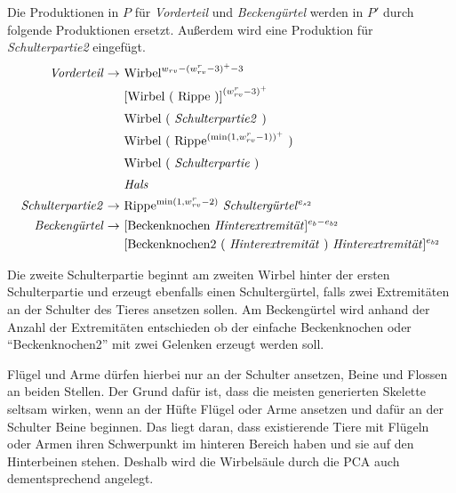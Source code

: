 Die Produktionen in $P$ für \emph{Vorderteil} und \emph{Beckengürtel} werden in $P'$ durch folgende Produktionen ersetzt. Außerdem wird eine Produktion für \emph{Schulterpartie2} eingefügt. 
\begin{align*}
 \text{\emph{Vorderteil}} \rightarrow &\text{ Wirbel}^{w_{rv} - (w_{rv}^r-3)^+ - 3}\\
    &\text{ [Wirbel ( Rippe )]}^{(w_{rv}^r - 3)^+}\\
    &\text{ Wirbel ( \emph{Schulterpartie2} )}^{\vphantom{(}}\\
    &\text{ Wirbel ( Rippe$^{(\text{min}(1, w_{rv}^r-1))^+}$ )}\\
    &\text{ Wirbel ( \emph{Schulterpartie} )}^{\vphantom{(}}\\
    &\text{ \emph{Hals}}^{\vphantom{(}}\\
 \text{\emph{Schulterpartie2}} \rightarrow &\text{ Rippe$^{\text{min}(1,w_{rv}^r-2)}$ \emph{Schultergürtel}$^{e_{s2}}$}\\ 
 \text{\emph{Beckengürtel}} \rightarrow &\text{ [Beckenknochen \emph{Hinterextremität}]$^{e_b - e_{b2}}$}\\
    &\text{ [Beckenknochen2 ( \emph{Hinterextremität} ) \emph{Hinterextremität}]$^{e_{b2}}$}
\end{align*}

Die zweite Schulterpartie beginnt am zweiten Wirbel hinter der ersten Schulterpartie und erzeugt ebenfalls einen Schultergürtel, falls zwei Extremitäten an der Schulter des Tieres ansetzen sollen. Am Beckengürtel wird anhand der Anzahl der Extremitäten entschieden ob der einfache Beckenknochen oder "`Beckenknochen2"' mit zwei Gelenken erzeugt werden soll.

Flügel und Arme dürfen hierbei nur an der Schulter ansetzen, Beine und Flossen an beiden Stellen. Der Grund dafür ist, dass die meisten generierten Skelette seltsam wirken, wenn an der Hüfte Flügel oder Arme ansetzen und dafür an der Schulter Beine beginnen. Das liegt daran, dass existierende Tiere mit Flügeln oder Armen ihren Schwerpunkt im hinteren Bereich haben und sie auf den Hinterbeinen stehen. Deshalb wird die Wirbelsäule durch die PCA auch dementsprechend angelegt.

